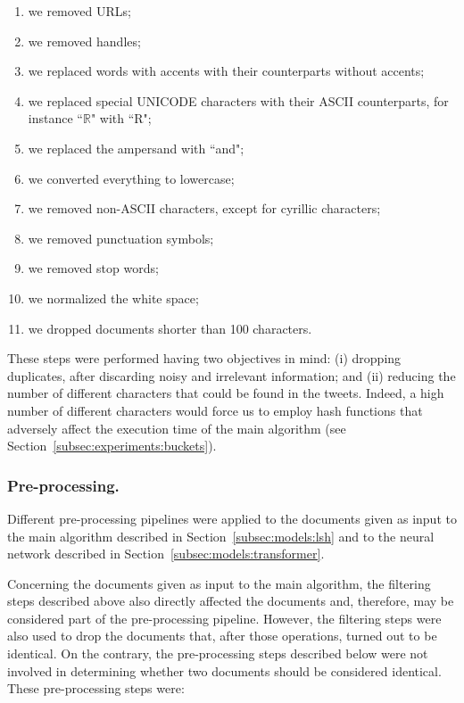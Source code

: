 \documentclass[runningheads]{llncs}
\begin{document}
\begin{enumerate}
  \item we removed URLs;
  \item we removed handles;
  \item we replaced words with accents with their counterparts without accents;
  \item we replaced special UNICODE characters with their ASCII counterparts, for instance “$\mathbb{R}$" with “R";
  \item we replaced the ampersand with “and";
  \item we converted everything to lowercase;
  \item we removed non-ASCII characters, except for cyrillic characters;
  \item we removed punctuation symbols;
  \item we removed stop words;
  \item we normalized the white space;
  \item we dropped documents shorter than 100 characters.
\end{enumerate}

These steps were performed having two objectives in mind: (i) dropping duplicates, after discarding noisy and irrelevant information; and (ii) reducing the number of different characters that could be found in the tweets. Indeed, a high number of different characters would force us to employ hash functions that adversely affect the execution time of the main algorithm (see Section~\ref{subsec:experiments:buckets}).
 
\subsubsection{Pre-processing.} Different pre-processing pipelines were applied to the documents given as input to the main algorithm described in Section~\ref{subsec:models:lsh} and to the neural network described in Section~\ref{subsec:models:transformer}.

Concerning the documents given as input to the main algorithm, the filtering steps described above also directly affected the documents and, therefore, may be considered part of the pre-processing pipeline. However, the filtering steps were also used to drop the documents that, after those operations, turned out to be identical. On the contrary, the pre-processing steps described below were not involved in determining whether two documents should be considered identical. These pre-processing steps were:
\end{document}
